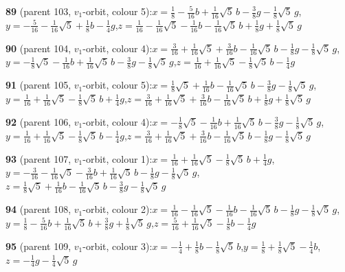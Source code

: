 \documentclass[10pt]{article}
\begin{document}
{\noindent\textbf{89} (parent 103, $v_1$-orbit, colour 5):\quad $x=\tfrac{1}{8}-\tfrac{5}{16}b+\tfrac{1}{16}\sqrt5\,b-\tfrac{3}{8}g-\tfrac{1}{8}\sqrt5\,g$,\quad $y=-\tfrac{5}{16}-\tfrac{1}{16}\sqrt5+\tfrac{1}{8}b-\tfrac{1}{4}g$,\quad $z=\tfrac{1}{16}-\tfrac{1}{16}\sqrt5-\tfrac{1}{16}b-\tfrac{1}{16}\sqrt5\,b+\tfrac{1}{8}g+\tfrac{1}{8}\sqrt5\,g$\par\smallskip
\noindent\textbf{90} (parent 104, $v_1$-orbit, colour 4):\quad $x=\tfrac{3}{16}+\tfrac{1}{16}\sqrt5+\tfrac{3}{16}b-\tfrac{1}{16}\sqrt5\,b-\tfrac{1}{8}g-\tfrac{1}{8}\sqrt5\,g$,\quad $y=-\tfrac{1}{8}\sqrt5-\tfrac{1}{16}b+\tfrac{1}{16}\sqrt5\,b-\tfrac{3}{8}g-\tfrac{1}{8}\sqrt5\,g$,\quad $z=\tfrac{1}{16}+\tfrac{1}{16}\sqrt5-\tfrac{1}{8}\sqrt5\,b-\tfrac{1}{4}g$\par\smallskip
\noindent\textbf{91} (parent 105, $v_1$-orbit, colour 5):\quad $x=\tfrac{1}{8}\sqrt5+\tfrac{1}{16}b-\tfrac{1}{16}\sqrt5\,b-\tfrac{3}{8}g-\tfrac{1}{8}\sqrt5\,g$,\quad $y=\tfrac{1}{16}+\tfrac{1}{16}\sqrt5-\tfrac{1}{8}\sqrt5\,b+\tfrac{1}{4}g$,\quad $z=\tfrac{3}{16}+\tfrac{1}{16}\sqrt5+\tfrac{3}{16}b-\tfrac{1}{16}\sqrt5\,b+\tfrac{1}{8}g+\tfrac{1}{8}\sqrt5\,g$\par\smallskip
\noindent\textbf{92} (parent 106, $v_1$-orbit, colour 4):\quad $x=-\tfrac{1}{8}\sqrt5-\tfrac{1}{16}b+\tfrac{1}{16}\sqrt5\,b-\tfrac{3}{8}g-\tfrac{1}{8}\sqrt5\,g$,\quad $y=\tfrac{1}{16}+\tfrac{1}{16}\sqrt5-\tfrac{1}{8}\sqrt5\,b-\tfrac{1}{4}g$,\quad $z=\tfrac{3}{16}+\tfrac{1}{16}\sqrt5+\tfrac{3}{16}b-\tfrac{1}{16}\sqrt5\,b-\tfrac{1}{8}g-\tfrac{1}{8}\sqrt5\,g$\par\smallskip
\noindent\textbf{93} (parent 107, $v_1$-orbit, colour 1):\quad $x=\tfrac{1}{16}+\tfrac{1}{16}\sqrt5-\tfrac{1}{8}\sqrt5\,b+\tfrac{1}{4}g$,\quad $y=-\tfrac{3}{16}-\tfrac{1}{16}\sqrt5-\tfrac{3}{16}b+\tfrac{1}{16}\sqrt5\,b-\tfrac{1}{8}g-\tfrac{1}{8}\sqrt5\,g$,\quad $z=\tfrac{1}{8}\sqrt5+\tfrac{1}{16}b-\tfrac{1}{16}\sqrt5\,b-\tfrac{3}{8}g-\tfrac{1}{8}\sqrt5\,g$\par\smallskip
\noindent\textbf{94} (parent 108, $v_1$-orbit, colour 2):\quad $x=\tfrac{1}{16}-\tfrac{1}{16}\sqrt5-\tfrac{1}{16}b-\tfrac{1}{16}\sqrt5\,b-\tfrac{1}{8}g-\tfrac{1}{8}\sqrt5\,g$,\quad $y=\tfrac{1}{8}-\tfrac{5}{16}b+\tfrac{1}{16}\sqrt5\,b+\tfrac{3}{8}g+\tfrac{1}{8}\sqrt5\,g$,\quad $z=\tfrac{5}{16}+\tfrac{1}{16}\sqrt5-\tfrac{1}{8}b-\tfrac{1}{4}g$\par\smallskip
\noindent\textbf{95} (parent 109, $v_1$-orbit, colour 3):\quad $x=-\tfrac{1}{4}+\tfrac{1}{8}b-\tfrac{1}{8}\sqrt5\,b$,\quad $y=\tfrac{1}{8}+\tfrac{1}{8}\sqrt5-\tfrac{1}{4}b$,\quad $z=-\tfrac{1}{4}g-\tfrac{1}{4}\sqrt5\,g$\par\smallskip
}
\end{document}
